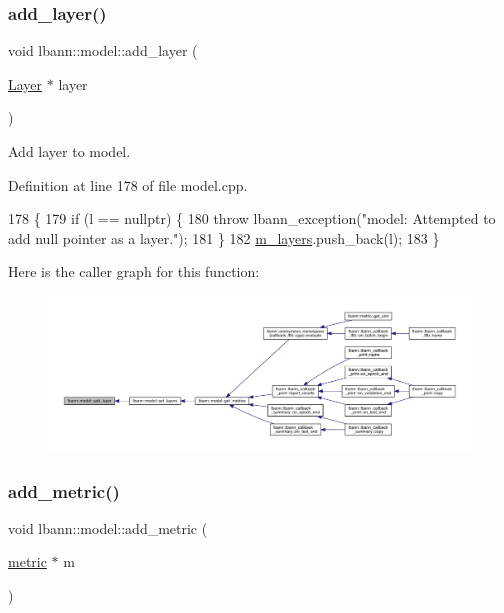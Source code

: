 \subsubsection{\texorpdfstring{add\+\_\+layer()}{add\_layer()}}
{\footnotesize\ttfamily void lbann\+::model\+::add\+\_\+layer (\begin{DoxyParamCaption}\item[{\hyperlink{classlbann_1_1Layer}{Layer} $\ast$}]{layer }\end{DoxyParamCaption})\hspace{0.3cm}{\ttfamily [virtual]}}

Add layer to model. 

Definition at line 178 of file model.\+cpp.


\begin{DoxyCode}
178                               \{
179   \textcolor{keywordflow}{if} (l == \textcolor{keyword}{nullptr}) \{
180     \textcolor{keywordflow}{throw} lbann\_exception(\textcolor{stringliteral}{"model: Attempted to add null pointer as a layer."});
181   \}
182   \hyperlink{classlbann_1_1model_a0229fc226ec163d1411548446104569d}{m\_layers}.push\_back(l);
183 \}
\end{DoxyCode}
Here is the caller graph for this function\+:\nopagebreak
\begin{figure}[H]
\begin{center}
\leavevmode
\includegraphics[width=350pt]{classlbann_1_1model_a5dfa9895024f07d273062b67d7a0dc01_icgraph}
\end{center}
\end{figure}
\mbox{\label{classlbann_1_1model_a2ad536c9aeb5a1dfaa5a96107d62c4a4}} 
\subsubsection{\texorpdfstring{add\+\_\+metric()}{add\_metric()}}
{\footnotesize\ttfamily void lbann\+::model\+::add\+\_\+metric (\begin{DoxyParamCaption}\item[{\hyperlink{classlbann_1_1metric}{metric} $\ast$}]{m }\end{DoxyParamCaption})}

